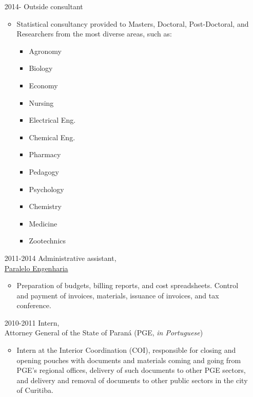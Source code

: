\documentclass[12pt]{article}
\begin{document}
\begin{itemize}
 \item[2014-] Outside consultant
  \begin{itemize}
   \item Statistical consultancy provided to Masters, Doctoral,
         Post-Doctoral, and Researchers from the most diverse areas,
         such as:

    \begin{multicols}{4}
      \begin{itemize}
      \item Agronomy
      \item Biology
      \item Economy
      \item Nursing
      \item Electrical Eng.
      \item Chemical Eng.
      \item Pharmacy
      \item Pedagogy
      \item Psychology
      \item Chemistry
      \item Medicine
      \item Zootechnics
     \end{itemize}
    \end{multicols}
  \end{itemize}
\end{itemize}

\begin{itemize}
 \item[2011-2014] Administrative assistant,\\
                  \href{https://paralelo.eng.br/}{\color{blue}Paralelo Engenharia}
  \begin{itemize}
   \item Preparation of budgets, billing reports, and cost spreadsheets.
         Control and payment of invoices, materials, issuance of
         invoices, and tax conference.
  \end{itemize}

 \item[2010-2011] Intern,\\
                  Attorney General of the State of Paraná
                  (PGE, \textit{in Portuguese})
  \begin{itemize}
   \item Intern at the Interior Coordination (COI), responsible for
         closing and opening pouches with documents and materials coming
         and going from PGE's regional offices, delivery of such
         documents to other PGE sectors, and delivery and removal of
         documents to other public sectors in the city of Curitiba.
  \end{itemize}
\end{itemize}
\end{document}
